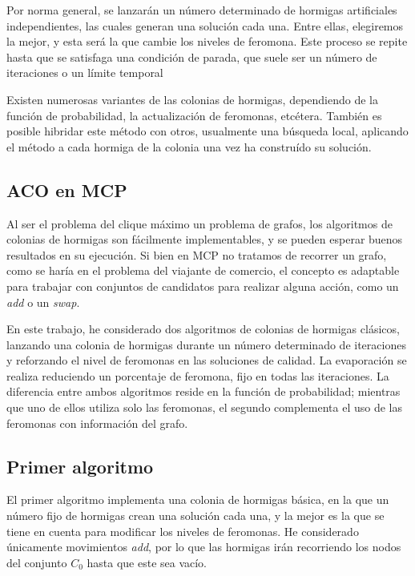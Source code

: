 Por norma general, se lanzarán un número determinado de hormigas artificiales independientes, las cuales generan
una solución cada una. Entre ellas, elegiremos la mejor, y esta será la que cambie los niveles de feromona.
Este proceso se repite hasta que se satisfaga una condición de parada, que suele ser un número de iteraciones o un
límite temporal

Existen numerosas variantes de las colonias de hormigas, dependiendo de la función de probabilidad, la
actualización de feromonas, etcétera. También es posible hibridar este método con otros, usualmente una
búsqueda local, aplicando el método a cada hormiga de la colonia una vez ha construído su solución.

\subsection{ACO en MCP}

Al ser el problema del clique máximo un problema de grafos, los algoritmos de colonias de hormigas son
fácilmente implementables, y se pueden esperar buenos resultados en su ejecución. Si bien en MCP
no tratamos de recorrer un grafo, como se haría en el problema del viajante de comercio, el concepto
es adaptable para trabajar con conjuntos de candidatos para realizar alguna acción, como un \textit{add}
o un \textit{swap}.

En este trabajo, he considerado dos algoritmos de colonias de hormigas clásicos, lanzando una colonia de hormigas
durante un número determinado de iteraciones y reforzando el nivel de feromonas en las soluciones de calidad.
La evaporación se realiza reduciendo un porcentaje de feromona, fijo en todas las iteraciones. La diferencia entre
ambos algoritmos reside en la función de probabilidad; mientras que uno de ellos utiliza solo las feromonas,
el segundo complementa el uso de las feromonas con información del grafo.

\subsection{Primer algoritmo}

El primer algoritmo implementa una colonia de hormigas básica, en la que un número fijo de hormigas crean
una solución cada una, y la mejor es la que se tiene en cuenta para modificar los niveles de feromonas.
He considerado únicamente movimientos \textit{add}, por lo que las hormigas irán recorriendo los nodos
del conjunto $C_0$ hasta que este sea vacío.

